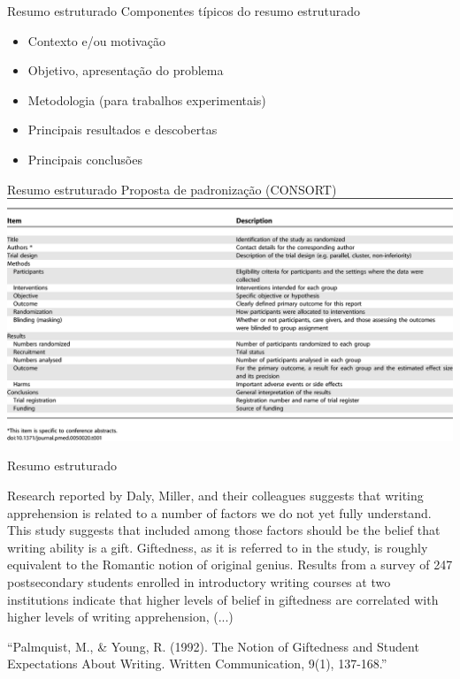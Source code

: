 \documentclass{beamer}
\begin{document}
\begin{frame}{Resumo estruturado}
  Componentes típicos do resumo estruturado
  \begin{itemize}
  \item Contexto e/ou motivação
  \item Objetivo, apresentação do problema
  \item Metodologia (para trabalhos experimentais)
  \item Principais resultados e descobertas
  \item Principais conclusões
  \end{itemize}
\end{frame}

\begin{frame}{Resumo estruturado}
  Proposta de padronização (CONSORT)
  \includegraphics[height=0.8\textheight]{Revisao_resumo/resumo_estruturado}
\end{frame}

\begin{frame}{Resumo estruturado}
  \begin{example}
    Research reported by Daly, Miller, and their colleagues suggests
    that writing apprehension is related to a number of factors we do
    not yet fully understand. This study suggests that included among
    those factors should be the belief that writing ability is a
    gift. Giftedness, as it is referred to in the study, is roughly
    equivalent to the Romantic notion of original genius. Results from
    a survey of 247 postsecondary students enrolled in introductory
    writing courses at two institutions indicate that higher levels of
    belief in giftedness are correlated with higher levels of writing
    apprehension, (...) 
  \end{example}
  ``Palmquist, M., \& Young, R. (1992). The Notion of Giftedness and
  Student Expectations About Writing. Written Communication, 9(1),
  137-168.''

\end{frame}
\end{document}
